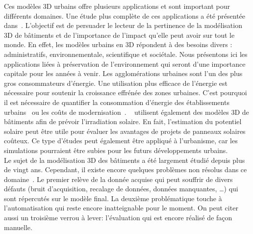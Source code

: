         Ces modèles 3D urbains offre plusieurs applications et sont important pour différents domaines.
        Une étude plus complète de ces applications a été présentée dans~\parencite{biljecki2015applications}.
        L'objectif est de persuader le lecteur de la pertinence de la modélisation 3D de bâtiments et de l'importance de l'impact qu'elle peut avoir sur tout le monde.
        En effet, les modèles urbains en 3D répondent à des besoins divers : administratifs, environnementale, scientifique et sociétale.
        Nous présentons ici les applications liées à préservation de l'environnement qui seront d'une importance capitale pour les années à venir.
        Les agglomérations urbaines sont l'un des plus gros consommateurs d'énergie.
        Une utilisation plus efficace de l'énergie est nécessaire pour soutenir la croissance effrénée des zones urbaines.
        C'est pourquoi il est nécessaire de quantifier la consommation d'énergie des établissements urbains~\parencite{wate20153d} ou les coûts de modernisation~\parencite{previtali2014automatic}.
        ~\textcite{biljecki2015propagation} utilisent également des modèles 3D de bâtiments afin de prévoir l'irradiation solaire.
        En fait, l'estimation du potentiel solaire peut être utile pour évaluer les avantages de projets de panneaux solaires coûteux.
        Ce type d'études peut également être appliqué à l'urbanisme, car les simulations pourraient être subies pour les futurs développements urbains.\\

        Le sujet de la modélisation 3D des bâtiments a été largement étudié depuis plus de vingt ans.
        Cependant, il existe encore quelques problèmes non résolus dans ce domaine~\parencite{musialski2013survey,lafarge2015some}.
        Le premier relève de la donnée acquise qui peut souffrir de divers défauts (bruit d'acquisition, recalage de données, données manquantes, \dots) qui sont répercutés sur le modèle final.
        La deuxième problématique touche à l'automatisation qui reste encore inatteignable pour le moment.
        On peut citer aussi un troisième verrou à lever: l'évaluation qui est encore réalisé de façon manuelle.

